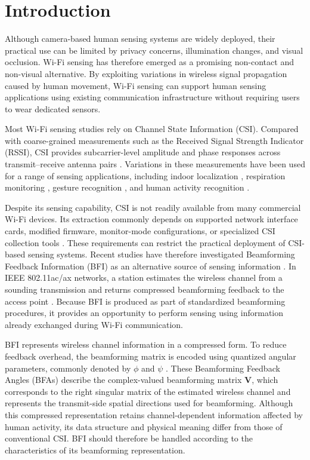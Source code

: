 \section{Introduction}

Although camera-based human sensing systems are widely deployed, their practical
use can be limited by privacy concerns, illumination changes, and visual
occlusion. Wi-Fi sensing has therefore emerged as a promising non-contact and
non-visual alternative. By exploiting variations in wireless signal propagation
caused by human movement, Wi-Fi sensing can support human sensing applications
using existing communication infrastructure without requiring users to wear
dedicated sensors.

Most Wi-Fi sensing studies rely on Channel State Information (CSI). Compared with
coarse-grained measurements such as the Received Signal Strength Indicator
(RSSI), CSI provides subcarrier-level amplitude and phase responses across
transmit--receive antenna pairs \cite{halperin2011tool}. Variations in these
measurements have been used for a range of sensing applications, including
indoor localization \cite{kotaru2015spotfi}, respiration monitoring
\cite{wang2017tensorbeat}, gesture recognition \cite{zheng2019widar3}, and
human activity recognition \cite{wang2015understanding}.

Despite its sensing capability, CSI is not readily available from many commercial
Wi-Fi devices. Its extraction commonly depends on supported network interface
cards, modified firmware, monitor-mode configurations, or specialized CSI
collection tools \cite{gringoli2019free}. These requirements can restrict the
practical deployment of CSI-based sensing systems. Recent studies have therefore
investigated Beamforming Feedback Information (BFI) as an alternative source of
sensing information \cite{beamsense2023,bfmsense2024,beamsense2025,wibfi2023}.
In IEEE 802.11ac/ax networks, a station estimates the wireless channel from a
sounding transmission and returns compressed beamforming feedback to the access
point \cite{ieee2021ax,ieee2013ac}. Because BFI is produced as part of
standardized beamforming procedures, it provides an opportunity to perform
sensing using information already exchanged during Wi-Fi communication.

BFI represents wireless channel information in a compressed form. To reduce
feedback overhead, the beamforming matrix is encoded using quantized angular
parameters, commonly denoted by $\phi$ and $\psi$
\cite{itahara2022beamforming,li2024efficient}. These Beamforming Feedback Angles
(BFAs) describe the complex-valued beamforming matrix $\mathbf{V}$, which
corresponds to the right singular matrix of the estimated wireless channel and
represents the transmit-side spatial directions used for beamforming. Although
this compressed representation retains channel-dependent information affected by
human activity, its data structure and physical meaning differ from those of
conventional CSI. BFI should therefore be handled according to the characteristics
of its beamforming representation.

